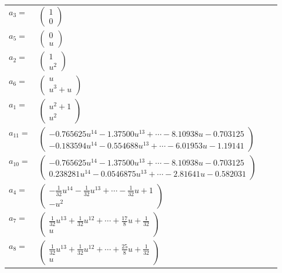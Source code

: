 \documentclass[1p]{elsarticle_modified}
\theoremstyle{definition}
\begin{document}
\begin{tabular}{m{7pt} m{180pt} m{7pt} m{180pt} }
\flushright $a_{3}=$&$\begin{pmatrix}1\\0\end{pmatrix}$ \\
\flushright $a_{5}=$&$\begin{pmatrix}0\\u\end{pmatrix}$ \\
\flushright $a_{2}=$&$\begin{pmatrix}1\\u^2\end{pmatrix}$ \\
\flushright $a_{6}=$&$\begin{pmatrix}u\\u^3+u\end{pmatrix}$ \\
\flushright $a_{1}=$&$\begin{pmatrix}u^2+1\\u^2\end{pmatrix}$ \\
\flushright $a_{11}=$&$\begin{pmatrix}-0.765625 u^{14}-1.37500 u^{13}+\cdots-8.10938 u-0.703125\\-0.183594 u^{14}-0.554688 u^{13}+\cdots-6.01953 u-1.19141\end{pmatrix}$ \\
\flushright $a_{10}=$&$\begin{pmatrix}-0.765625 u^{14}-1.37500 u^{13}+\cdots-8.10938 u-0.703125\\0.238281 u^{14}-0.0546875 u^{13}+\cdots-2.81641 u-0.582031\end{pmatrix}$ \\
\flushright $a_{4}=$&$\begin{pmatrix}-\frac{1}{32} u^{14}-\frac{1}{32} u^{13}+\cdots-\frac{1}{32} u+1\\- u^2\end{pmatrix}$ \\
\flushright $a_{7}=$&$\begin{pmatrix}\frac{1}{32} u^{13}+\frac{1}{32} u^{12}+\cdots+\frac{17}{8} u+\frac{1}{32}\\u\end{pmatrix}$ \\
\flushright $a_{8}=$&$\begin{pmatrix}\frac{1}{32} u^{13}+\frac{1}{32} u^{12}+\cdots+\frac{25}{8} u+\frac{1}{32}\\u\end{pmatrix}$ \\

\end{tabular}
\end{document}
